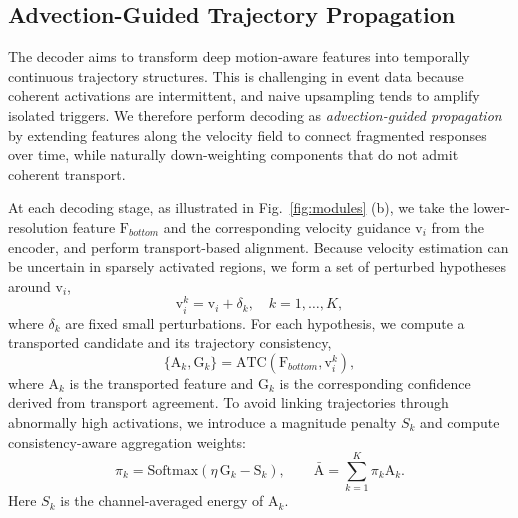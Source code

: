 \documentclass[runningheads]{llncs}
\begin{document}
\subsection{Advection-Guided Trajectory Propagation}
\label{sec:adv_propagation}

The decoder aims to transform deep motion-aware features into temporally continuous trajectory structures. 
This is challenging in event data because coherent activations are intermittent, and naive upsampling tends to amplify isolated triggers.
We therefore perform decoding as \emph{advection-guided propagation} by extending features along the velocity field to connect fragmented responses over time, while naturally down-weighting components that do not admit coherent transport.

At each decoding stage, as illustrated in Fig.~\ref{fig:modules} (b), we take the lower-resolution feature $\mathrm{F}_{bottom}$ and the corresponding velocity guidance $\mathrm{v}_{i}$ from the encoder, and perform transport-based alignment.
Because velocity estimation can be uncertain in sparsely activated regions, we form a set of perturbed hypotheses around $\mathrm{v}_{i}$,
\begin{equation}
\mathrm{v}^{k}_{i}=\mathrm{v}_{i}+\delta_{k},\quad k=1,\ldots,K,
\end{equation}
where $\delta_{k}$ are fixed small perturbations.
For each hypothesis, we compute a transported candidate and its trajectory consistency,
\begin{equation}
\{\mathrm{A}_{k},\mathrm{G}_{k}\}=\mathrm{ATC}(\mathrm{F}_{bottom},\mathrm{v}^{k}_{i}),
\end{equation}
where $\mathrm{A}_{k}$ is the transported feature and $\mathrm{G}_{k}$ is the corresponding confidence derived from transport agreement.
To avoid linking trajectories through abnormally high activations, we introduce a magnitude penalty $S_k$ and compute consistency-aware aggregation weights:
\begin{equation}
\pi_{k}=\mathrm{Softmax}\left(\eta\,\mathrm{G}_{k}-\mathrm{S}_{k}\right),
\qquad
\bar{\mathrm{A}}=\sum_{k=1}^{K}\pi_{k}\mathrm{A}_{k}.
\end{equation}
Here $S_k$ is the channel-averaged energy of $\mathrm{A}_k$.
\end{document}
